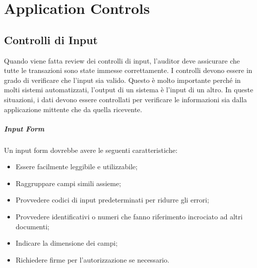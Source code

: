 \chapter{Application Controls}
\label{cs:ac}

\section{Controlli di Input}
Quando viene fatta review dei controlli di input, l'auditor deve
assicurare che tutte le transazioni sono state immesse correttamente.
I controlli devono essere in grado di verificare che l'input sia valido.
Questo è molto importante perché in molti sistemi automatizzati,
l'output di un sistema è l'input di un altro. In queste situazioni,
i dati devono essere controllati per verificare le informazioni sia
dalla applicazione mittente che da quella ricevente.

\paragraph{Input Form}
Un input form dovrebbe avere le seguenti caratteristiche:
\begin{itemize}
\item Essere facilmente leggibile e utilizzabile;
\item Raggruppare campi simili assieme;
\item Provvedere codici di input predeterminati per ridurre
gli errori;
\item Provvedere identificativi o numeri che fanno riferimento
incrociato ad altri documenti;
\item Indicare la dimensione dei campi;
\item Richiedere firme per l'autorizzazione se necessario.
\end{itemize}

